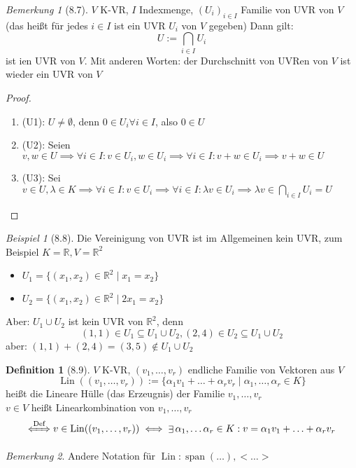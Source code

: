 \documentclass[a4paper]{scrartcl}
\DeclareMathOperator{\Exists}{\exists}
\DeclareMathOperator{\Forall}{\forall}
\DeclareMathOperator{\Lin}{Lin}
\DeclareMathOperator{\Span}{span}
\theoremstyle{definition}
\newtheorem{defn}{Definition}
\theoremstyle{plain}
\theoremstyle{plain}
\theoremstyle{remark}
\newtheorem{remark}{Bemerkung}
\theoremstyle{remark}
\theoremstyle{remark}
\theoremstyle{remark}
\theoremstyle{remark}
\newtheorem{ex}{Beispiel}
\begin{document}
\begin{remark}[8.7]
$V$ K-VR, $I$ Indexmenge, $(U_i)_{i\in I}$ Familie von UVR von $V$ (das heißt für jedes $i\in I$ ist ein UVR $U_i$ von $V$ gegeben)
Dann gilt:
\[U := \bigcap_{i \in I} U_i\]
ist ien UVR von $V$. Mit anderen Worten: der Durchschnitt von UVRen von $V$ ist wieder ein UVR von $V$
\end{remark}
\begin{proof}
\begin{enumerate}
\item (U1): $U \neq \emptyset$, denn $0 \in U_i \Forall i\in I$, also $0 \in U$
\item (U2): Seien $v,w \in U \implies \Forall i \in I: v\in U_i, w \in U_i \implies \Forall i\in I: v + w \in U_i \implies v + w \in U$
\item (U3): Sei $v \in U, \lambda \in K \implies \Forall i\in I: v\in U_i \implies \Forall i\in I: \lambda v \in U_i \implies \lambda v \in \bigcap_{i\in I} U_i = U$
\end{enumerate}
\end{proof}
\begin{ex}[8.8]
Die Vereinigung von UVR ist im Allgemeinen kein UVR, zum Beispiel $K = \mathbb{R}, V =\mathbb{R}^2$
\begin{itemize}
\item $U_1 = \{(x_1, x_2) \in \mathbb{R}^2 \mid x_1 = x_2\}$
\item $U_2 = \{(x_1, x_2) \in \mathbb{R}^2 \mid 2 x_1 = x_2\}$
\end{itemize}
Aber: $U_1 \cup U_2$ ist kein UVR von $\mathbb{R}^2$, denn
\[(1,1) \in U_1 \subseteq U_1 \cup U_2, (2, 4) \in U_2 \subseteq U_1 \cup U_2\]
aber: $(1, 1) + (2, 4) = (3, 5) \not\in U_1 \cup U_2$
\end{ex}
\begin{defn}[8.9]
$V$ K-VR, $(v_1, \ldots, v_r)$ endliche Familie von Vektoren aus $V$
\[\Lin((v_1, \ldots, v_r)) := \{\alpha_1 v_1 + \ldots + \alpha_r v_r \mid \alpha_1, \ldots, \alpha_r \in K\}\]
heißt die Lineare Hülle (das Erzeugnis) der Familie $v_1, \ldots, v_r$ \\
  $v \in V$ heißt Linearkombination von $v_1, \ldots, v_r$
\[\xLeftrightarrow{\text{Def}} v\in \Lin((v_1, \ldots, v_r)) \iff \Exists \alpha_1, \ldots \alpha_r \in K: v = \alpha_1 v_1 + \ldots + \alpha_r v_r\]
\end{defn}
\begin{remark}
Andere Notation für $\Lin: \Span(\ldots), <\ldots>$
\end{remark}
\end{document}
